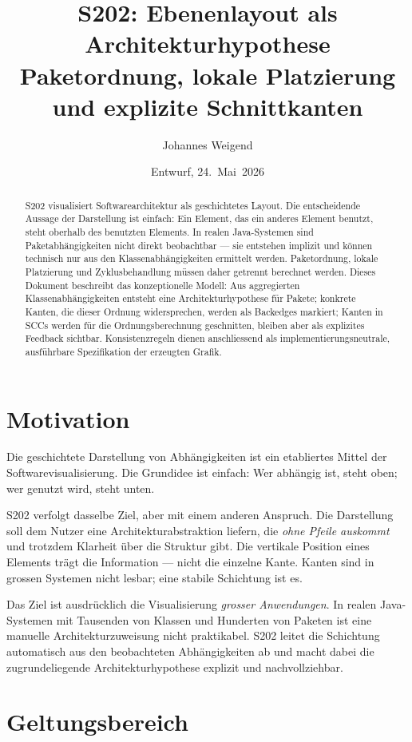 \documentclass[a4paper,11pt]{article}
\title{S202: Ebenenlayout als Architekturhypothese\\
  \large Paketordnung, lokale Platzierung und explizite Schnittkanten}
\author{Johannes Weigend}
\date{Entwurf, 24.~Mai~2026}
\begin{document}
\maketitle

\begin{abstract}
S202 visualisiert Softwarearchitektur als geschichtetes Layout. Die
entscheidende Aussage der Darstellung ist einfach: Ein Element, das ein
anderes Element benutzt, steht oberhalb des benutzten Elements. In realen
Java-Systemen sind Paketabh\"angigkeiten nicht direkt beobachtbar --- sie
entstehen implizit und k\"onnen technisch nur aus den Klassenabh\"angigkeiten
ermittelt werden. Paketordnung, lokale Platzierung und Zyklusbehandlung
m\"ussen daher getrennt berechnet werden. Dieses Dokument beschreibt das
konzeptionelle Modell: Aus aggregierten Klassenabh\"angigkeiten entsteht
eine Architekturhypothese f\"ur Pakete; konkrete Kanten, die dieser Ordnung
widersprechen, werden als Backedges markiert; Kanten in SCCs werden f\"ur
die Ordnungsberechnung geschnitten, bleiben aber als explizites Feedback
sichtbar. Konsistenzregeln dienen anschliessend als implementierungsneutrale,
ausf\"uhrbare Spezifikation der erzeugten Grafik.
\end{abstract}

\section{Motivation}

Die geschichtete Darstellung von Abh\"angigkeiten ist ein etabliertes Mittel
der Softwarevisualisierung. Die Grundidee ist einfach: Wer abh\"angig ist,
steht oben; wer genutzt wird, steht unten.

S202 verfolgt dasselbe Ziel, aber mit einem anderen Anspruch. Die Darstellung
soll dem Nutzer eine Architekturabstraktion liefern, die \emph{ohne Pfeile
auskommt} und trotzdem Klarheit \"uber die Struktur gibt. Die vertikale
Position eines Elements tr\"agt die Information --- nicht die einzelne Kante.
Kanten sind in grossen Systemen nicht lesbar; eine stabile Schichtung ist es.

Das Ziel ist ausdr\"ucklich die Visualisierung \emph{grosser Anwendungen}.
In realen Java-Systemen mit Tausenden von Klassen und Hunderten von Paketen
ist eine manuelle Architekturzuweisung nicht praktikabel. S202 leitet die
Schichtung automatisch aus den beobachteten Abh\"angigkeiten ab und macht
dabei die zugrundeliegende Architekturhypothese explizit und nachvollziehbar.

\section{Geltungsbereich}
\end{document}
